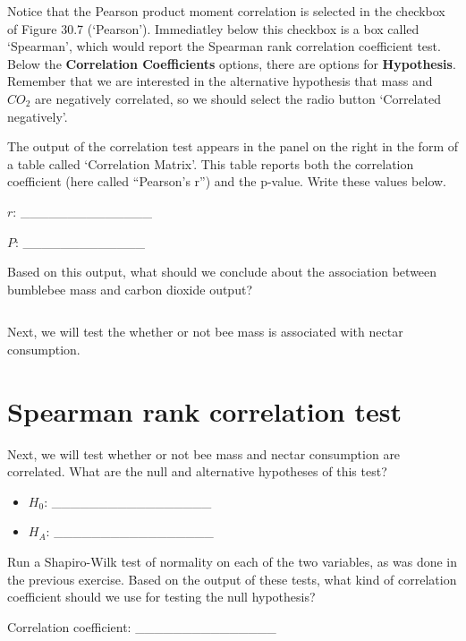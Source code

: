 \documentclass[
]{scrbook}
\begin{document}
Notice that the Pearson product moment correlation is selected in the checkbox of Figure 30.7 (`Pearson').
Immediatley below this checkbox is a box called `Spearman', which would report the Spearman rank correlation coefficient test.
Below the \textbf{Correlation Coefficients} options, there are options for \textbf{Hypothesis}.
Remember that we are interested in the alternative hypothesis that mass and \(CO_{2}\) are negatively correlated, so we should select the radio button `Correlated negatively'.

The output of the correlation test appears in the panel on the right in the form of a table called `Correlation Matrix'.
This table reports both the correlation coefficient (here called ``Pearson's r'') and the p-value.
Write these values below.

\(r\): \_\_\_\_\_\_\_\_\_\_\_\_\_\_

\(P\): \_\_\_\_\_\_\_\_\_\_\_\_\_

Based on this output, what should we conclude about the association between bumblebee mass and carbon dioxide output?

\begin{verbatim}

\end{verbatim}

Next, we will test the whether or not bee mass is associated with nectar consumption.

\hypertarget{spearman-rank-correlation-test}{%
\section{Spearman rank correlation test}\label{spearman-rank-correlation-test}}

Next, we will test whether or not bee mass and nectar consumption are correlated.
What are the null and alternative hypotheses of this test?

\begin{itemize}
\item
  \(H_{0}\): \_\_\_\_\_\_\_\_\_\_\_\_\_\_\_\_\_
\item
  \(H_{A}\): \_\_\_\_\_\_\_\_\_\_\_\_\_\_\_\_\_
\end{itemize}

Run a Shapiro-Wilk test of normality on each of the two variables, as was done in the previous exercise.
Based on the output of these tests, what kind of correlation coefficient should we use for testing the null hypothesis?

Correlation coefficient: \_\_\_\_\_\_\_\_\_\_\_\_\_\_\_
\end{document}
